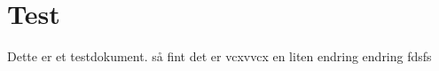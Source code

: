 \documentclass{article}
\begin{document}
\section{Test}
Dette er et testdokument. så fint det er vcxvvcx en liten endring  endring  fdsfs

\lipsum[1-2]
\end{document}
